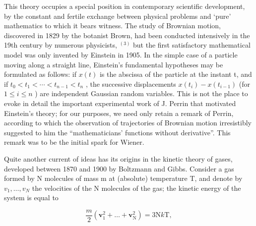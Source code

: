 
This theory occupies a special position in contemporary scientific development, by the constant and fertile exchange between physical problems and `pure' mathematics to which it bears witness. The study of Brownian motion, discovered in 1829 by the botanist Brown, had been conducted intensively in the 19th century by numerous physicists, \(^{(3)}\) but the first satisfactory mathematical model was only invented by Einstein in 1905. In the simple case of a particle moving along a straight line, Einstein's fundamental hypotheses may be formulated as follows: if \(x(t)\) is the abscissa of the particle at the instant t, and if \(t_{0} < t_{1} < \cdots < t_{n-1} < t_{n}\) , the successive displacements \(x(t_{i}) - x(t_{i-1})\) (for \(1 \leqslant i \leqslant n\) ) are independent Gaussian random variables. This is not the place to evoke in detail the important experimental work of J. Perrin that motivated Einstein's theory; for our purposes, we need only retain a remark of Perrin, according to which the observation of trajectories of Brownian motion irresistibly suggested to him the ``mathematicians' functions without derivative''. This remark was to be the initial spark for Wiener.

Quite another current of ideas has its origins in the kinetic theory of gases, developed between 1870 and 1900 by Boltzmann and Gibbs. Consider a gas formed by N molecules of mass m at (absolute) temperature T, and denote by \(v_{1},\ldots,v_{N}\) the velocities of the N molecules of the gas; the kinetic energy of the system is equal to

\[
\frac {m}{2} (\mathbf {v} _ {1} ^ {2} + \dots + \mathbf {v} _ {\mathrm{N}} ^ {2}) = 3 \mathrm{N} k \mathrm{T},\tag{1}
\]

